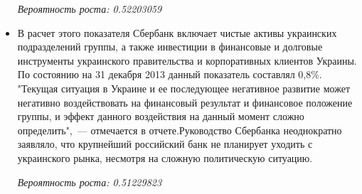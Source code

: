 \documentclass[14pt]{matmex-diploma-custom}
\begin{document}
\begin{appendices}
\begin{itemize}
\emph{Вероятность роста: 0.52203059}

\item В расчет этого показателя Сбербанк включает чистые активы украинских подразделений группы, а также инвестиции в финансовые и долговые инструменты украинского правительства и корпоративных клиентов Украины. По состоянию на 31 декабря 2013 данный показатель составлял 0,8\%. "Текущая ситуация в Украине и ее последующее негативное развитие может негативно воздействовать на финансовый результат и финансовое положение группы, и эффект данного воздействия на данный момент сложно определить",~--- отмечается в отчете.Руководство Сбербанка неоднократно заявляло, что крупнейший российский банк не планирует уходить с украинского рынка, несмотря на сложную политическую ситуацию.

\emph{Вероятность роста: 0.51229823}
\end{itemize}

\end{appendices}
\end{document}
